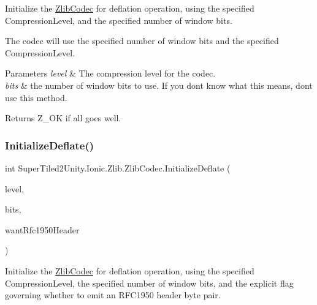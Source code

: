 Initialize the \mbox{\hyperlink{class_super_tiled2_unity_1_1_ionic_1_1_zlib_1_1_zlib_codec}{Zlib\+Codec}} for deflation operation, using the specified Compression\+Level, and the specified number of window bits. 

The codec will use the specified number of window bits and the specified Compression\+Level. 


\begin{DoxyParams}{Parameters}
{\em level} & The compression level for the codec.\\
\hline
{\em bits} & the number of window bits to use. If you don\textquotesingle{}t know what this means, don\textquotesingle{}t use this method.\\
\hline
\end{DoxyParams}
\begin{DoxyReturn}{Returns}
Z\+\_\+\+OK if all goes well.
\end{DoxyReturn}
\mbox{\label{class_super_tiled2_unity_1_1_ionic_1_1_zlib_1_1_zlib_codec_acb745f70067c5b131d3306ae84f17c5f}} 
\subsubsection{\texorpdfstring{Initialize\+Deflate()}{InitializeDeflate()}\hspace{0.1cm}{\footnotesize\ttfamily [5/5]}}
{\footnotesize\ttfamily int Super\+Tiled2\+Unity.\+Ionic.\+Zlib.\+Zlib\+Codec.\+Initialize\+Deflate (\begin{DoxyParamCaption}\item[{\mbox{\hyperlink{namespace_super_tiled2_unity_1_1_ionic_1_1_zlib_a20f6771804996c363f454ad9765cd7db}{Compression\+Level}}}]{level,  }\item[{int}]{bits,  }\item[{bool}]{want\+Rfc1950\+Header }\end{DoxyParamCaption})}



Initialize the \mbox{\hyperlink{class_super_tiled2_unity_1_1_ionic_1_1_zlib_1_1_zlib_codec}{Zlib\+Codec}} for deflation operation, using the specified Compression\+Level, the specified number of window bits, and the explicit flag governing whether to emit an R\+F\+C1950 header byte pair. 


